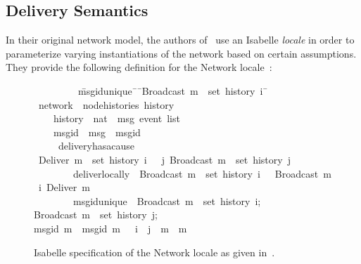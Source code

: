 \subsection{Delivery Semantics}
In their original network model, the authors of~\citet{gomes17} use an Isabelle
\emph{locale} in order to parameterize varying instantiations of the network
based on certain assumptions. They provide the following definition for the
Network locale~\citep{gomes17}:
\begin{figure}[H]
\begin{isabelle}
~~~~~~~~\ \=msg{\isacharunderscore}id{\isacharunderscore}unique{\isacharcolon}\ \={\isasymrbrakk}\ \={\isachardoublequoteopen}Broadcast\ m\ {\isasymin}\ set\ {\isacharparenleft}history\ i{\isacharparenright}\ \=\kill
{}\ network\ {\isacharequal}\ node{\isacharunderscore}histories\ history\\
~~~~\>history\ {\isacharcolon}{\isacharcolon}\ {\isachardoublequoteopen}nat\ {\isasymRightarrow}\ {\isacharprime}msg\ event\ list{\isachardoublequoteclose}\ {\isacharplus}\\
~~~~\>msg{\isacharunderscore}id\ {\isacharcolon}{\isacharcolon}\ {\isachardoublequoteopen}{\isacharprime}msg\ {\isasymRightarrow}\ {\isacharprime}msgid{\isachardoublequoteclose}\\
~~~~\ delivery{\isacharunderscore}has{\isacharunderscore}a{\isacharunderscore}cause{\isacharcolon}\\
\>\>{\isasymlbrakk}\ {\isachardoublequoteopen}Deliver\ m\ {\isasymin}\ set\ {\isacharparenleft}history\ i{\isacharparenright}\ \>\>{\isasymrbrakk}\ {\isasymLongrightarrow}\ {\isasymexists}j{\isachardot}\ Broadcast\ m\ {\isasymin}\ set\ {\isacharparenleft}history\ j{\isacharparenright}{\isachardoublequoteclose}\\
~~~~~~~~\>deliver{\isacharunderscore}locally{\isacharcolon}\ \>{\isasymlbrakk}\ \>{\isachardoublequoteopen}Broadcast\ m\ {\isasymin}\ set\ {\isacharparenleft}history\ i{\isacharparenright}\ \>{\isasymrbrakk}\ {\isasymLongrightarrow}\  Broadcast\ m\ {\isasymsqsubset}\isactrlsup i\ Deliver\ m{\isachardoublequoteclose}\\
~~~~~~~~\>msg{\isacharunderscore}id{\isacharunderscore}unique{\isacharcolon}\ \>{\isasymlbrakk}\ \>{\isachardoublequoteopen}Broadcast\ m{}\ {\isasymin}\ set\ {\isacharparenleft}history\ i{\isacharparenright};\\
\>\>\>Broadcast\ m{}\ {\isasymin}\ set\ {\isacharparenleft}history\ j{\isacharparenright};\\
\>\>\>msg{\isacharunderscore}id\ m{}\ {\isacharequal}\ msg{\isacharunderscore}id\ m{}\ \>{\isasymrbrakk}\ {\isasymLongrightarrow}\ i\ {\isacharequal}\ j\ {\isasymand}\ m{}\ {\isacharequal}\ m{}{\isachardoublequoteclose}
\end{isabelle}
\centering
\caption{Isabelle specification of the Network locale as given
  in~\citet{gomes17}.}
\end{figure}

